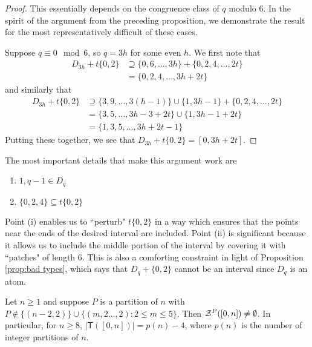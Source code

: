 \begin{proof}
	This essentially depends on the congruence class of $q$ modulo $6$.
	In the spirit of the argument from the preceding proposition, we demonstrate the result for the most representatively difficult of these cases.
	
	Suppose $q \equiv 0 \mod 6$, so $q = 3h$ for some even $h$.
	We first note that
	\begin{align*}
	D_{3h} + t\{0,2\} 
	&\supseteq \{0,6,\dots, 3h\} + \{0,2,4,\dots, 2t\} \\
	& = \{0,2,4,\dots, 3h+2t \}
	\end{align*}
	and similarly that
	\begin{align*}
	D_{3h} + t\{0,2\}
	&\supseteq \{3,9,\dots, 3(h-1) \}\cup\{1,3h-1\} + \{0,2,4,\dots, 2t \} \\
	&= \{3,5,\dots, 3h-3 + 2t \}\cup \{1,3h-1 + 2t \} \\
	&= \{1,3,5,\dots, 3h+2t-1 \}
	\end{align*}
	Putting these together, we see that $D_{3h} + t\{0,2\} = [ 0,3h+2t ]$.
\end{proof}

\begin{rk}
	The most important details that make this argument work are
	\begin{enumerate}[label={\rm (\roman{*})}]
		\item $1,q-1\in D_q$
		\item $\{0,2,4\} \subseteq t\{0,2\}$
	\end{enumerate}
	Point (i) enables us to ``perturb" $t\{0,2\}$ in a way which ensures that the points near the ends of the desired interval are included.
	Point (ii) is significant because it allows us to include the middle portion of the interval by covering it with ``patches" of length $6$.
	This is also a comforting constraint in light of Proposition \ref{prop:bad types}, which says that $D_q + \{0,2\}$ cannot be an interval since $D_q$ is an atom.
\end{rk}


\begin{thm} \label{thm:good types}
	Let $n\ge 1$ and suppose $P$ is a partition of $n$ with $P \notin \{(n-2,2)\} \cup \{ (m,2\dots,2) : 2\le m \le 5\}$.
	Then $\mathcal{Z}^P([ 0,n ]) \neq \emptyset$.
	In particular, for $n\ge 8$, $|\mathsf{T}([ 0,n ])| = p(n)-4$, where $p(n)$ is the number of integer partitions of $n$.
\end{thm}

